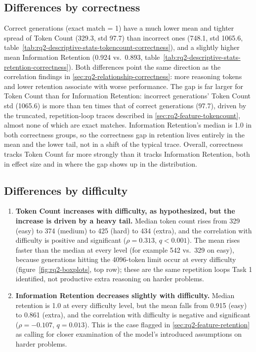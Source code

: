 \subsection{Differences by correctness}
\label{sec:rq2-by-correctness}

Correct generations (exact match = 1) have a much lower mean and tighter spread of Token Count (329.3, std 97.7) than incorrect ones (748.1, std 1065.6, table~\ref{tab:rq2-descriptive-stats-tokencount-correctness}), and a slightly higher mean Information Retention (0.924 vs.\ 0.893, table~\ref{tab:rq2-descriptive-stats-retention-correctness}). Both differences point the same direction as the correlation findings in \ref{sec:rq2-relationship-correctness}: more reasoning tokens and lower retention associate with worse performance. The gap is far larger for Token Count than for Information Retention: incorrect generations' Token Count std (1065.6) is more than ten times that of correct generations (97.7), driven by the truncated, repetition-loop traces described in \ref{sec:rq2-feature-tokencount}, almost none of which are exact matches. Information Retention's median is 1.0 in both correctness groups, so the correctness gap in retention lives entirely in the mean and the lower tail, not in a shift of the typical trace. Overall, correctness tracks Token Count far more strongly than it tracks Information Retention, both in effect size and in where the gap shows up in the distribution.

\subsection{Differences by difficulty}
\label{sec:rq2-by-difficulty}

\begin{enumerate}
\item \label{item:rq2-finding-tokencount-difficulty} \textbf{Token Count increases with difficulty, as hypothesized, but the increase is driven by a heavy tail.} Median token count rises from 329 (easy) to 374 (medium) to 425 (hard) to 434 (extra), and the correlation with difficulty is positive and significant ($\rho=0.313$, $q<0.001$). The mean rises faster than the median at every level (for example 542 vs.\ 329 on easy), because generations hitting the 4096-token limit occur at every difficulty (figure~\ref{fig:rq2-boxplots}, top row); these are the same repetition loops Task 1 identified, not productive extra reasoning on harder problems.
\item \label{item:rq2-finding-retention-difficulty} \textbf{Information Retention decreases slightly with difficulty.} Median retention is 1.0 at every difficulty level, but the mean falls from 0.915 (easy) to 0.861 (extra), and the correlation with difficulty is negative and significant ($\rho=-0.107$, $q=0.013$). This is the case flagged in \ref{sec:rq2-feature-retention} as calling for closer examination of the model's introduced assumptions on harder problems.
\end{enumerate}

